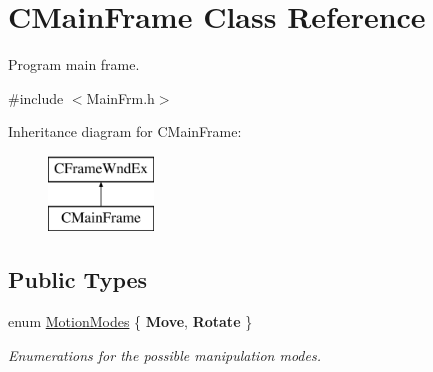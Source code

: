 \hypertarget{class_c_main_frame}{\section{C\+Main\+Frame Class Reference}
\label{class_c_main_frame}
}


Program main frame.  




{\ttfamily \#include $<$Main\+Frm.\+h$>$}

Inheritance diagram for C\+Main\+Frame\+:\begin{figure}[H]
\begin{center}
\leavevmode
\includegraphics[height=2.000000cm]{class_c_main_frame}
\end{center}
\end{figure}
\subsection*{Public Types}
\begin{DoxyCompactItemize}
\item 
\hypertarget{class_c_main_frame_a89722c82d82f95a761772a8dd9755b7b}{enum \hyperlink{class_c_main_frame_a89722c82d82f95a761772a8dd9755b7b}{Motion\+Modes} \{ {\bfseries Move}, 
{\bfseries Rotate}
 \}}\label{class_c_main_frame_a89722c82d82f95a761772a8dd9755b7b}

\begin{DoxyCompactList}\small\item\em Enumerations for the possible manipulation modes. \end{DoxyCompactList}\end{DoxyCompactItemize}
